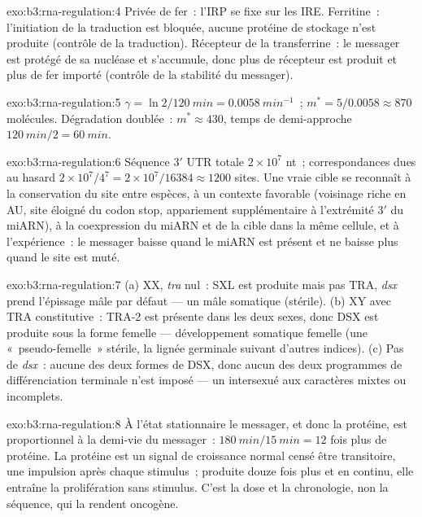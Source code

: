 \begin{solution}{exo:b3:rna-regulation:4}
Privée de fer~: l'IRP se fixe sur les IRE. Ferritine~: l'initiation de
la traduction est bloquée, aucune protéine de stockage n'est produite
(contrôle de la traduction). Récepteur de la transferrine~: le messager
est protégé de sa nucléase et s'accumule, donc plus de récepteur est
produit et plus de fer importé (contrôle de la stabilité du messager).
\end{solution}

\begin{solution}{exo:b3:rna-regulation:5}
$\gamma = \ln 2/\qty{120}{min} = \qty{0.0058}{min^{-1}}$~; $m^{*} =
5/0.0058 \approx 870$ molécules. Dégradation doublée~: $m^{*} \approx 430$,
temps de demi-approche $\qty{120}{min}/2 = \qty{60}{min}$.
\end{solution}

\begin{solution}{exo:b3:rna-regulation:6}
Séquence 3$'$ UTR totale $2\times 10^{7}$ nt~; correspondances dues au hasard $2\times
10^{7}/4^{7} = 2\times 10^{7}/\num{16384} \approx \num{1200}$ sites.
Une vraie cible se reconnaît à la conservation du site entre espèces,
à un contexte favorable (voisinage riche en AU, site éloigné du codon
stop, appariement supplémentaire à l'extrémité 3$'$ du miARN), à la
coexpression du miARN et de la cible dans la même cellule, et à
l'expérience~: le messager baisse quand le miARN est présent et ne
baisse plus quand le site est muté.
\end{solution}

\begin{solution}{exo:b3:rna-regulation:7}
(a) XX, \emph{tra} nul~: SXL est produite mais pas TRA, \emph{dsx} prend
l'épissage mâle par défaut --- un mâle somatique (stérile). (b) XY avec
TRA constitutive~: TRA-2 est présente dans les deux sexes, donc DSX est
produite sous la forme femelle --- développement somatique femelle (une
«~pseudo-femelle~» stérile, la lignée germinale suivant d'autres
indices). (c) Pas de \emph{dsx}~: aucune des deux formes de DSX, donc
aucun des deux programmes de différenciation terminale n'est imposé ---
un intersexué aux caractères mixtes ou incomplets.
\end{solution}

\begin{solution}{exo:b3:rna-regulation:8}
À l'état stationnaire le messager, et donc la protéine, est
proportionnel à la demi-vie du messager~:
$\qty{180}{min}/\qty{15}{min} = 12$ fois plus de protéine. La protéine est un signal de croissance
normal censé être transitoire, une impulsion après chaque stimulus~;
produite douze fois plus et en continu, elle entraîne la prolifération
sans stimulus. C'est la dose et la chronologie, non la séquence, qui la
rendent oncogène.
\end{solution}

